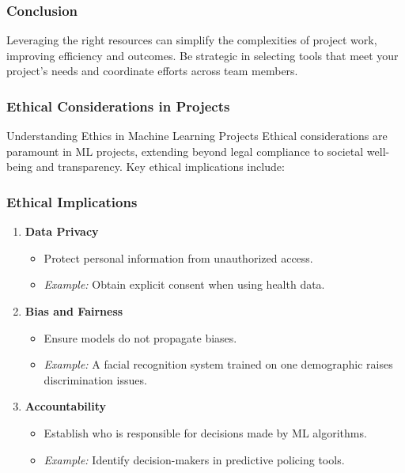 \documentclass[aspectratio=169]{beamer}
\begin{document}
\begin{frame}
    \frametitle{Conclusion}
    Leveraging the right resources can simplify the complexities of project work, improving efficiency and outcomes. Be strategic in selecting tools that meet your project's needs and coordinate efforts across team members.
\end{frame}

\begin{frame}[fragile]
    \frametitle{Ethical Considerations in Projects}
    \begin{block}{Understanding Ethics in Machine Learning Projects}
        Ethical considerations are paramount in ML projects, extending beyond legal compliance to societal well-being and transparency. Key ethical implications include:
    \end{block}
\end{frame}

\begin{frame}[fragile]
    \frametitle{Ethical Implications}
    \begin{enumerate}
        \item \textbf{Data Privacy}
        \begin{itemize}
            \item Protect personal information from unauthorized access.
            \item \emph{Example:} Obtain explicit consent when using health data.
        \end{itemize}
        
        \item \textbf{Bias and Fairness}
        \begin{itemize}
            \item Ensure models do not propagate biases.
            \item \emph{Example:} A facial recognition system trained on one demographic raises discrimination issues.
        \end{itemize}

        \item \textbf{Accountability}
        \begin{itemize}
            \item Establish who is responsible for decisions made by ML algorithms.
            \item \emph{Example:} Identify decision-makers in predictive policing tools.
        \end{itemize}
    \end{enumerate}
\end{frame}
\end{document}
